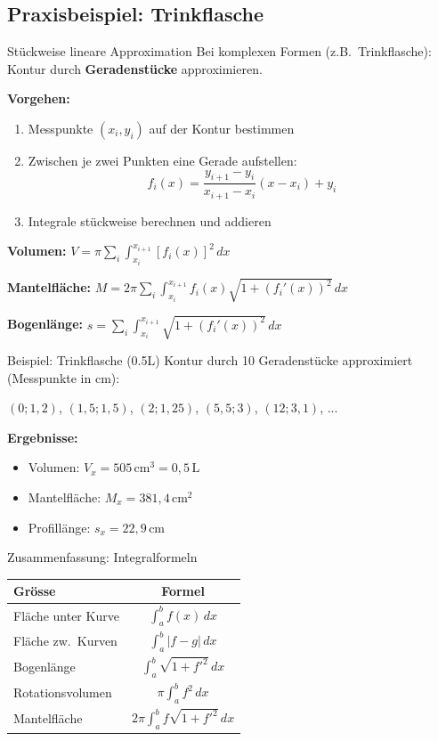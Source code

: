 \documentclass[a4paper,fontsize = 7pt]{scrartcl}
\renewcommand*{\arraystretch}{2}
\begin{document}
\subsection{Praxisbeispiel: Trinkflasche}

\begin{mainbox}{Stückweise lineare Approximation}
Bei komplexen Formen (z.B.\ Trinkflasche): Kontur durch \textbf{Geradenstücke} approximieren.

\textbf{Vorgehen:}
\begin{enumerate}
	\item Messpunkte $(x_i, y_i)$ auf der Kontur bestimmen
	\item Zwischen je zwei Punkten eine Gerade aufstellen:
	$$f_i(x) = \frac{y_{i+1} - y_i}{x_{i+1} - x_i}(x - x_i) + y_i$$
	\item Integrale stückweise berechnen und addieren
\end{enumerate}

\textbf{Volumen:} $V = \pi \sum_i \int_{x_i}^{x_{i+1}} [f_i(x)]^2\,dx$

\textbf{Mantelfläche:} $M = 2\pi \sum_i \int_{x_i}^{x_{i+1}} f_i(x) \sqrt{1 + (f_i'(x))^2}\,dx$

\textbf{Bogenlänge:} $s = \sum_i \int_{x_i}^{x_{i+1}} \sqrt{1 + (f_i'(x))^2}\,dx$
\end{mainbox}

\begin{subbox}{Beispiel: Trinkflasche (0.5L)}
Kontur durch 10 Geradenstücke approximiert (Messpunkte in cm):

$(0; 1{,}2)$, $(1{,}5; 1{,}5)$, $(2; 1{,}25)$, $(5{,}5; 3)$, $(12; 3{,}1)$, ...

\textbf{Ergebnisse:}
\begin{itemize}
	\item Volumen: $V_x = 505\,\text{cm}^3 = 0{,}5\,\text{L}$
	\item Mantelfläche: $M_x = 381{,}4\,\text{cm}^2$
	\item Profillänge: $s_x = 22{,}9\,\text{cm}$
\end{itemize}
\end{subbox}

\begin{mainbox}{Zusammenfassung: Integralformeln}
\renewcommand*{\arraystretch}{1.6}
\begin{center}
\begin{tabular}{l|c}
\textbf{Grösse} & \textbf{Formel} \\
\hline
Fläche unter Kurve & $\int_a^b f(x)\,dx$ \\
Fläche zw.\ Kurven & $\int_a^b |f - g|\,dx$ \\
Bogenlänge & $\int_a^b \sqrt{1 + f'^2}\,dx$ \\
Rotationsvolumen & $\pi \int_a^b f^2\,dx$ \\
Mantelfläche & $2\pi \int_a^b f\sqrt{1+f'^2}\,dx$ \\
\end{tabular}
\end{center}
\end{mainbox}
\end{document}
